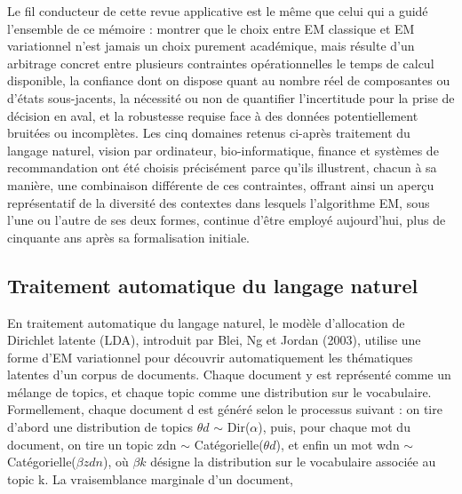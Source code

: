 Le fil conducteur de cette revue applicative est le même que celui qui a guidé l'ensemble de ce mémoire : montrer que le choix entre EM classique et EM variationnel n'est jamais un choix purement académique, mais résulte d'un arbitrage concret entre plusieurs contraintes opérationnelles  le temps de calcul disponible, la confiance dont on dispose quant au nombre réel de composantes ou d'états sous-jacents, la nécessité ou non de quantifier l'incertitude pour la prise de décision en aval, et la robustesse requise face à des données potentiellement bruitées ou incomplètes. Les cinq domaines retenus ci-après  traitement du langage naturel, vision par ordinateur, bio-informatique, finance et systèmes de recommandation  ont été choisis précisément parce qu'ils illustrent, chacun à sa manière, une combinaison différente de ces contraintes, offrant ainsi un aperçu représentatif de la diversité des contextes dans lesquels l'algorithme EM, sous l'une ou l'autre de ses deux formes, continue d'être employé aujourd'hui, plus de cinquante ans après sa formalisation initiale.

\subsection{Traitement automatique du langage naturel}
En traitement automatique du langage naturel, le modèle d'allocation de Dirichlet latente (LDA), introduit par Blei, Ng et Jordan (2003), utilise une forme d'EM variationnel pour découvrir automatiquement les thématiques latentes d'un corpus de documents. Chaque document y est représenté comme un mélange de topics, et chaque topic comme une distribution sur le vocabulaire. Formellement, chaque document d est généré selon le processus suivant : on tire d'abord une distribution de topics $\theta d$ $\sim $ Dir($\alpha $), puis, pour chaque mot du document, on tire un topic zdn $\sim $ Catégorielle($\theta d$), et enfin un mot wdn $\sim $ Catégorielle($\beta zdn$), où $\beta k$ désigne la distribution sur le vocabulaire associée au topic k. La vraisemblance marginale d'un document,

